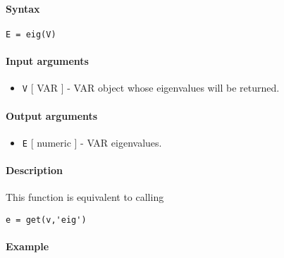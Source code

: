 


	\paragraph{Syntax}\label{syntax}

\begin{verbatim}
E = eig(V)
\end{verbatim}

\paragraph{Input arguments}\label{input-arguments}

\begin{itemize}
\itemsep1pt\parskip0pt
\item
  \texttt{V} {[} VAR {]} - VAR object whose eigenvalues will be
  returned.
\end{itemize}

\paragraph{Output arguments}\label{output-arguments}

\begin{itemize}
\itemsep1pt\parskip0pt
\item
  \texttt{E} {[} numeric {]} - VAR eigenvalues.
\end{itemize}

\paragraph{Description}\label{description}

This function is equivalent to calling

\begin{verbatim}
e = get(v,'eig')
\end{verbatim}

\paragraph{Example}\label{example}


